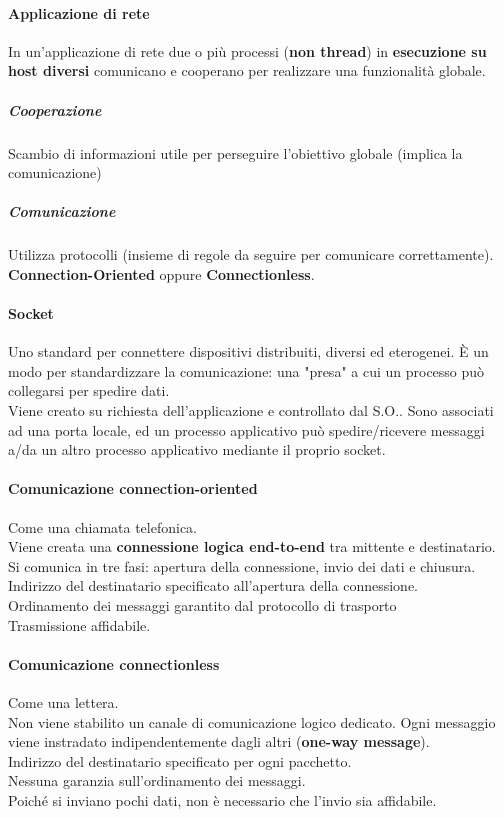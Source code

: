 \documentclass[10pt]{article}
\begin{document}
\paragraph{Applicazione di rete} In un'applicazione di rete due o più processi (\textbf{non thread}) in \textbf{esecuzione su host diversi} comunicano e cooperano per realizzare una funzionalità globale.
\subparagraph{Cooperazione} Scambio di informazioni utile per perseguire l'obiettivo globale (implica la comunicazione)
\subparagraph{Comunicazione} Utilizza protocolli (insieme di regole da seguire per comunicare correttamente).\\\textbf{Connection-Oriented} oppure \textbf{Connectionless}.
\paragraph{Socket} Uno standard per connettere dispositivi distribuiti, diversi ed eterogenei. È un modo per standardizzare la comunicazione: una "presa" a cui un processo può collegarsi per spedire dati.\\
Viene creato su richiesta dell'applicazione e controllato dal S.O.. Sono associati ad una porta locale, ed un processo applicativo può spedire/ricevere messaggi a/da un altro processo applicativo mediante il proprio socket.
\paragraph{Comunicazione connection-oriented} Come una chiamata telefonica.\\
Viene creata una \textbf{connessione logica end-to-end} tra mittente e destinatario. Si comunica in tre fasi: apertura della connessione, invio dei dati e chiusura.\\
Indirizzo del destinatario specificato all'apertura della connessione.\\
Ordinamento dei messaggi garantito dal protocollo di trasporto\\
Trasmissione affidabile.
\paragraph{Comunicazione connectionless} Come una lettera.\\
Non viene stabilito un canale di comunicazione logico dedicato. Ogni messaggio viene instradato indipendentemente dagli altri (\textbf{one-way message}).\\
Indirizzo del destinatario specificato per ogni pacchetto.\\
Nessuna garanzia sull'ordinamento dei messaggi.\\
Poiché si inviano pochi dati, non è necessario che l'invio sia affidabile.
\end{document}
